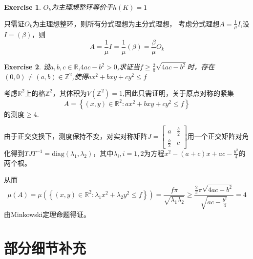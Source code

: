 \documentclass[12pt, a4paper]{ctexart}
\newenvironment{prooff}{{\noindent\it\textcolor{cyan!40!black}{Proof}:}\quad}{\par}
\newcommand{\bbrace}[1]{\left\{ #1 \right\} }
\newtheorem{exer}{Exercise}[subsection]
\begin{document}
\begin{exer}
    $O_{k}$为主理想整环等价于$h(K)=1$
\end{exer}
\begin{prooff}
    只需证$O_{k}$为主理想整环，则所有分式理想为主分式理想，
    考虑分式理想$A=\frac{1}{\mu }I$,设$I=(\beta)$，则\begin{equation*}
        A=\frac{1}{\mu }I=\frac{1}{\mu }(\beta)=\frac{\beta}{\mu }O_k
    \end{equation*}
\end{prooff}
\begin{exer}
    设$a,b,c\in \mathbb{R}$,$4ac-b^2>0$,求证当$f\ge \frac{2}{\pi}\sqrt{4ac-b^2}$时，存在$(0,0)\neq (a,b)\in \mathbb{Z}^2$,使得$ax^2+bxy+cy^2\le f$
\end{exer}
\begin{prooff}
    考虑$\mathbb{R}^2$上的格$\mathbb{Z}^2$，其体积为$V(\mathbb{Z}^2)=1$,因此只需证明，关于原点对称的紧集\begin{equation*}
        A=\bbrace{(x,y)\in \mathbb{R}^2:ax^2+bxy+cy^2\le f}
    \end{equation*}
    的测度$\ge 4$.

    由于正交变换下，测度保持不变，对实对称矩阵$J=\begin{bmatrix}
            a           & \frac{b}{2} \\
            \frac{b}{2} & c
        \end{bmatrix}$用一个正交矩阵对角化得到$TJT^{-1}=\text{diag}(\lambda_1,\lambda_2)$，其中$\lambda_i,i=1,2$为方程$x^2-(a+c)x+ac-\frac{b^2}{4}$的两个根。

    从而
    \begin{equation*}
        \mu(A)=\mu(\bbrace{(x,y)\in \mathbb{R}^2:\lambda_1x^2+\lambda_2y^2\le f})=\frac{f\pi}{ \sqrt{\lambda_1\lambda_2}}\ge \frac{\frac{2}{\pi}\pi \sqrt{4ac-b^2}}{\sqrt{ac-\frac{b^2}{4}}}=4
    \end{equation*}
    由Minkowski定理命题得证。

\end{prooff}

\newpage
\section{部分细节补充}


\end{document}
